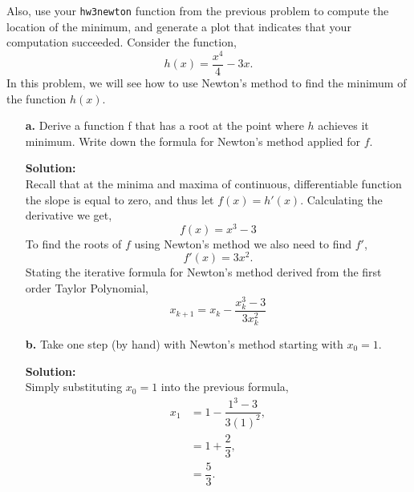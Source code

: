 \documentclass[12pt]{article}
\makeatletter
\theoremstyle{homework}
\newenvironment{exercise}[1]
{\def\@currentlabel{#1}\exercisecore}
{\endexercisecore}
\newcommand{\localhead}[1]{\par\smallskip\noindent\textbf{#1}\nobreak\\}%
\newcommand\solution{\localhead{Solution:}}
\makeatother
\begin{document}
\begin{exercise}{Chapter 4: 6 (a,b)}
Also, use your \texttt{hw3newton} function from the previous problem
to compute the location of the minimum, and generate a plot that indicates that your computation succeeded. Consider the 
function, 
\begin{equation*}
  h(x) = \dfrac{x^4}{4} - 3x.
\end{equation*}
In this problem, we will see how to use Newton's method to find the minimum of the function $h(x)$.\\

\end{exercise}
\begin{enumerate}
  \item[\textbf{a.}] Derive a function f that has a root at the point where $h$ achieves it minimum. Write down the formula for Newton's
  method applied for $f$. \\

  \solution Recall that at the minima and maxima of continuous, differentiable function the slope is equal to zero, and thus let $f(x) = h'(x)$. Calculating the derivative
  we get, 
  \begin{equation*}
    f(x) = x^3 - 3
  \end{equation*}
  To find the roots of $f$ using Newton's method we also need to find $f'$,
  \begin{equation*}
    f'(x) = 3x^2.
  \end{equation*}
  Stating the iterative formula for Newton's method derived from the first order Taylor Polynomial,
  \begin{equation*}
    x_{k+1} = x_k - \dfrac{x_k^3 - 3}{3x_k^2}
  \end{equation*}
  \vspace{.25in}

  \item[\textbf{b.}]Take one step (by hand) with Newton's method starting with $x_0 = 1$.\\
 
  \solution Simply substituting $x_0 = 1$ into the previous formula,
  \begin{align*}
    x_1 &= 1 - \dfrac{1^3 - 3}{3(1)^2},\\
    &= 1 + \dfrac{2}{3},\\
    &=\dfrac{5}{3}.\\
  \end{align*}


\end{enumerate}
\end{document}
